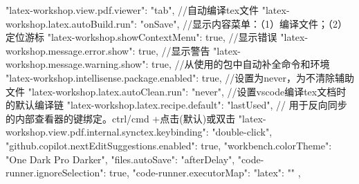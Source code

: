 {"latex-workshop.view.pdf.viewer": "tab",
//自动编译tex文件
"latex-workshop.latex.autoBuild.run": "onSave",
//显示内容菜单：（1）编译文件；（2）定位游标
"latex-workshop.showContextMenu": true,
//显示错误
"latex-workshop.message.error.show": true,
//显示警告
"latex-workshop.message.warning.show": true,
//从使用的包中自动补全命令和环境
"latex-workshop.intellisense.package.enabled": true,
//设置为never，为不清除辅助文件
"latex-workshop.latex.autoClean.run": "never",
//设置vscode编译tex文档时的默认编译链
"latex-workshop.latex.recipe.default": "lastUsed",
// 用于反向同步的内部查看器的键绑定。ctrl/cmd +点击(默认)或双击
"latex-workshop.view.pdf.internal.synctex.keybinding": "double-click",
"github.copilot.nextEditSuggestions.enabled": true,
"workbench.colorTheme": "One Dark Pro Darker",
"files.autoSave": "afterDelay",
"code-runner.ignoreSelection": true,
"code-runner.executorMap": {
    "latex": ""
},
}

